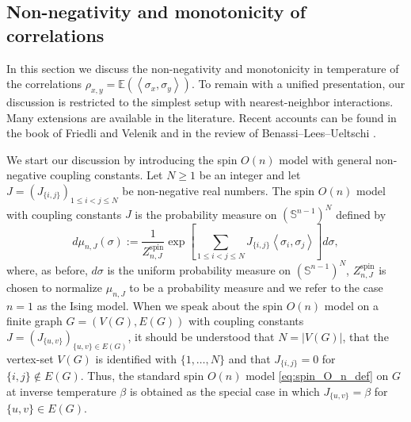 \documentclass[12pt,reqno]{article}
\def\E{\mathbb{E}}
\renewcommand{\S}{\mathbb{S}}
\begin{document}
\subsection{Non-negativity and monotonicity of correlations}
\label{spin_nonnegativity_of_correlations}
In this section we discuss the non-negativity and monotonicity in temperature of the correlations $\rho_{x,y}=\E(\left\langle\sigma_x,\sigma_y\right\rangle)$. To remain with a unified presentation, our discussion is restricted to the simplest setup with nearest-neighbor interactions. Many extensions are available in the literature. Recent accounts can be found in the book of Friedli and Velenik \cite[Sections~3.6, 3.8 and 3.9]{friedli2016statistical} and in the review of Benassi--Lees--Ueltschi \cite{benassi2016correlation}.

We start our discussion by introducing the spin $O(n)$ model with general
non-negative coupling constants. Let $N\ge 1$ be an integer and let $J = (J_{\{i,j\}})_{1\le i<j\le N}$
be non-negative real numbers. The spin $O(n)$ model with coupling
constants $J$ is the probability measure on $(\S^{n-1})^{N}$
defined by
\begin{equation}\label{eq:spin_O_n_general_couplings_def}
  d\mu_{n,J}(\sigma) := \frac{1}{Z^{\text{spin}}_{n,J}} \exp \left[\sum_{1\le i<j\le N} J_{\{i,j\}} \left\langle\sigma_i,\sigma_j\right\rangle\right] d\sigma,
\end{equation}
where, as before, $d\sigma$ is the uniform probability measure on
$(\S^{n-1})^{N}$, $Z^{\text{spin}}_{n,J}$ is chosen to
normalize $\mu_{n,J}$ to be a probability measure and we refer to the case $n=1$ as the Ising model.
When we speak about the spin $O(n)$ model on a finite graph $G = (V(G), E(G))$ with coupling constants $J=(J_{\{u,v\}})_{\{u,v\} \in E(G)}$, it should be understood that $N = |V(G)|$, that the vertex-set $V(G)$ is identified with $\{1,\ldots, N\}$ and that $J_{\{i,j\}}=0$ for $\{i,j\} \notin E(G)$. Thus, the standard spin $O(n)$ model \eqref{eq:spin_O_n_def} on $G$ at inverse temperature $\beta$ is obtained as the special case in which $J_{\{u,v\}} = \beta$ for $\{u,v\}\in E(G)$.
\end{document}
